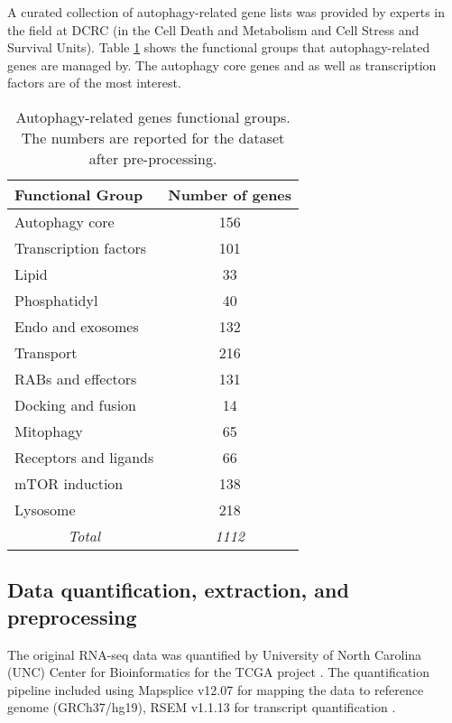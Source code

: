         
    A curated collection of autophagy-related gene lists was provided by experts in the field at DCRC (in the Cell Death and Metabolism and Cell Stress and Survival Units). Table \ref{table:autophagy} shows the functional groups that autophagy-related genes are managed by. The autophagy core genes and as well as transcription factors are of the most interest. 
    
    
            \begin{table}[!htbp]
            \centering
            \caption{Autophagy-related genes functional groups. The numbers are reported for the dataset after pre-processing.}
            \label{table:autophagy}
            \begin{tabular}{l|c}
            \small
            \textbf{Functional Group} & \multicolumn{1}{l}{\textbf{Number of genes}} \\ \hline
            Autophagy core & 156 \\ \hline
            Transcription factors & 101 \\ \hline
            Lipid & 33 \\ \hline
            Phosphatidyl & 40 \\ \hline
            Endo and exosomes & 132 \\ \hline
            Transport & 216 \\ \hline
            RABs and effectors & 131 \\ \hline
            Docking and fusion & 14 \\ \hline
            Mitophagy & 65 \\ \hline
            Receptors and ligands & 66 \\ \hline
            mTOR induction & 138 \\ \hline
            Lysosome & 218 \\ \hline
            \multicolumn{1}{c|}{\textit{Total}} & \textit{1112}
            \end{tabular}
            \end{table}
            
            
    \subsection{Data quantification, extraction, and preprocessing}
    The original RNA-seq data was quantified by University of North Carolina (UNC) Center for Bioinformatics for the TCGA project \cite{UniversityofNorthCarolinaUNCCenterforBioinfromatics2013TCGAData}. The quantification pipeline included  using Mapsplice v12.07 \cite{wang2010mapsplice} for mapping the data to reference genome (GRCh37/hg19), RSEM v1.1.13 \cite{li2011rsem} for transcript quantification \cite{UniversityofNorthCarolinaUNCCenterforBioinfromatics2013TCGAData}. 

